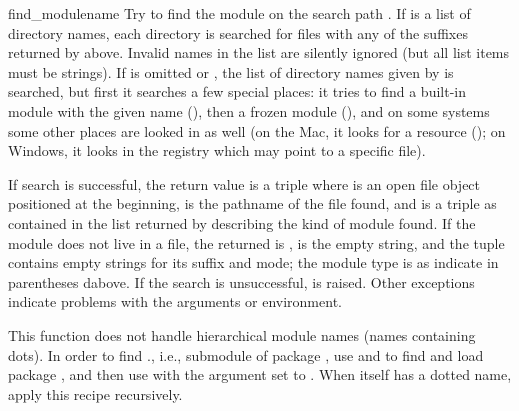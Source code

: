 \begin{funcdesc}{find_module}{name}
Try to find the module  on the search path .  If
 is a list of directory names, each directory is searched
for files with any of the suffixes returned by 
above.  Invalid names in the list are silently ignored (but all list
items must be strings).  If  is omitted or , the
list of directory names given by  is searched, but
first it searches a few special places: it tries to find a built-in
module with the given name (), then a frozen module
(), and on some systems some other places are looked
in as well (on the Mac, it looks for a resource ();
on Windows, it looks in the registry which may point to a specific
file).

If search is successful, the return value is a triple
 where
 is an open file object positioned at the beginning,
 is the pathname of the
file found, and  is a triple as contained in the list
returned by  describing the kind of module found.
If the module does not live in a file, the returned  is
,  is the empty string, and the
 tuple contains empty strings for its suffix and
mode; the module type is as indicate in parentheses dabove.  If the
search is unsuccessful,  is raised.  Other
exceptions indicate problems with the arguments or environment.

This function does not handle hierarchical module names (names
containing dots).  In order to find ., i.e., submodule
 of package , use  and
 to find and load package , and then use
 with the  argument set to
.  When  itself has a dotted name, apply
this recipe recursively.
\end{funcdesc}

